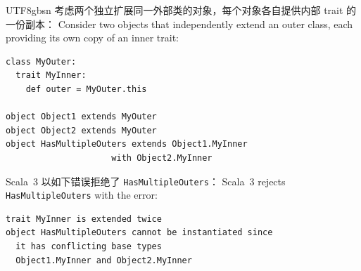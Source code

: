 \begin{CJK*}{UTF8}{gbsn}
\ifPaperChinese
考虑两个独立扩展同一外部类的对象，每个对象各自提供内部 trait 的一份副本：
\else
Consider two objects that independently extend an outer class,
each providing its own copy of an inner trait:
\fi

\begin{listing}[htbp]
  \caption{}
  \label{lst:scala-conflict}
\begin{verbatim}
class MyOuter:
  trait MyInner:
    def outer = MyOuter.this

object Object1 extends MyOuter
object Object2 extends MyOuter
object HasMultipleOuters extends Object1.MyInner
                     with Object2.MyInner
\end{verbatim}
\end{listing}

\noindent
\ifPaperChinese
Scala~3 以如下错误拒绝了 \texttt{HasMultipleOuters}：
\else
Scala~3 rejects \texttt{HasMultipleOuters} with the error:
\fi

\begin{verbatim}
trait MyInner is extended twice
object HasMultipleOuters cannot be instantiated since
  it has conflicting base types
  Object1.MyInner and Object2.MyInner
\end{verbatim}


\end{CJK*}
